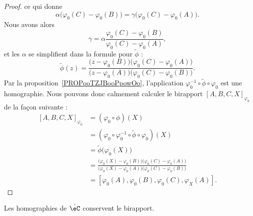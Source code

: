 \begin{proof}
    ce qui donne
    \begin{equation}
        \alpha\big( \varphi_0(C)-\varphi_0(B) \big)=\gamma\big( \varphi_0(C)-\varphi_0(A) \big).
    \end{equation}
    Nous avons alors
    \begin{equation}
        \gamma=\alpha\frac{ \varphi_0(C)-\varphi_0(B) }{ \varphi_0(C)-\varphi_0(A) },
    \end{equation}
    et les \( \alpha\) se simplifient dans la formule pour \( \tilde \phi\) :
    \begin{equation}
        \tilde \phi(z)=\frac{ \big( z- \varphi_0(B)   \big)\big( \varphi_0(C)-\varphi_0(A) \big) }{ \big( z-\varphi_0(A)\big)\big( \varphi_0(C)-\varphi_0(B) \big) }.
    \end{equation}
    Par la proposition~\ref{PROPooTZJBooPpowOo}, l'application \( \varphi_0^{-1}\circ\tilde \phi\circ\varphi_0\) est une homographie. Nous pouvons donc calmement calculer le birapport \( [A,B,C,X]_{\varphi_0}\) de la façon suivante :
    \begin{subequations}
        \begin{align}
            [A,B,C,X]_{\varphi_0}&=(\varphi_0\circ\phi)(X)\\
            &=(\varphi_0\circ\varphi_0^{-1}\circ\tilde \phi\circ\varphi_0)(X)\\
            &=\tilde \phi\big( \varphi_0(X) \big)\\
            &=\frac{ \big( \varphi_0(X)-\varphi_0(B) \big)\big( \varphi_0(C)-\varphi_0(A) \big) }{ \big( \varphi_0(X)-\varphi_0(A) \big)\big( \varphi_0(C)-\varphi_0(B) \big) }\\
            &=[\varphi_0(A),\varphi_0(B),\varphi_0(C),\varphi_X(A)].
        \end{align}
    \end{subequations}
\end{proof}

\begin{proposition}     \label{PROPooQGPFooReNaGq}
    Les homographies de \( \hat \eC\) conservent le birapport.
\end{proposition}

